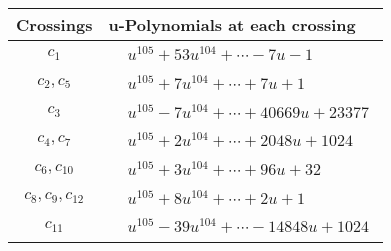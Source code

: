 \documentclass[1p]{elsarticle_modified}
\theoremstyle{definition}
\begin{document}
\begin{tabular}{m{50pt}|m{274pt}}
Crossings & \hspace{64pt}u-Polynomials at each crossing \\
\hline $$\begin{aligned}c_{1}\end{aligned}$$&$\begin{aligned}
&u^{105}+53 u^{104}+\cdots-7 u-1
\end{aligned}$\\
\hline $$\begin{aligned}c_{2},c_{5}\end{aligned}$$&$\begin{aligned}
&u^{105}+7 u^{104}+\cdots+7 u+1
\end{aligned}$\\
\hline $$\begin{aligned}c_{3}\end{aligned}$$&$\begin{aligned}
&u^{105}-7 u^{104}+\cdots+40669 u+23377
\end{aligned}$\\
\hline $$\begin{aligned}c_{4},c_{7}\end{aligned}$$&$\begin{aligned}
&u^{105}+2 u^{104}+\cdots+2048 u+1024
\end{aligned}$\\
\hline $$\begin{aligned}c_{6},c_{10}\end{aligned}$$&$\begin{aligned}
&u^{105}+3 u^{104}+\cdots+96 u+32
\end{aligned}$\\
\hline $$\begin{aligned}c_{8},c_{9},c_{12}\end{aligned}$$&$\begin{aligned}
&u^{105}+8 u^{104}+\cdots+2 u+1
\end{aligned}$\\
\hline $$\begin{aligned}c_{11}\end{aligned}$$&$\begin{aligned}
&u^{105}-39 u^{104}+\cdots-14848 u+1024
\end{aligned}$\\
\hline
\end{tabular}\\~\\
\newpage\renewcommand{\arraystretch}{1}
\end{document}

